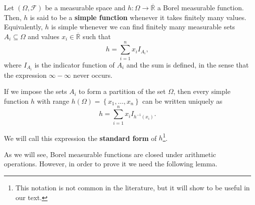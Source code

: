 \begin{defn} Let \(\left(\Omega,\mathcal{F}\right)\) be a
measurable space and \(h\colon\Omega\to\overline{\mathbb{R}}\) a Borel measurable function. Then,
\(h\) is said to be a \textbf{simple function} whenever it takes finitely many
values. Equivalently, \(h\) is simple whenever we can find finitely many
measurable sets \(A_i\subseteq\Omega\) and values \(x_i\in\overline{\mathbb{R}}\) such that
	\[h=\sum_{i=1}^{n}x_iI_{A_i},\] where \(I_{A_i}\) is the indicator function
of \(A_i\) and the sum is defined, in the sense that the expression
\(\infty-\infty\) never occurs.
\end{defn}
\begin{remk} If we impose the sets \(A_i\) to form a partition of the set
\(\Omega\), then every simple function \(h\) with range
\(h(\Omega)=\left\{x_1,\dots,x_n\right\}\) can be written uniquely as
	\[h=\sum_{i=1}^{n}x_iI_{h^{-1}(x_i)}.\]
	
	We will call this expression the \textbf{standard form} of
\(h\)\footnote{This notation is not common in the literature, but it will show to
be useful in our text.}.
\end{remk}
As we will see, Borel measurable functions are closed under arithmetic
operations. However, in order to prove it we need the following lemma.  %

